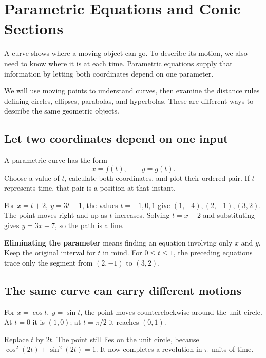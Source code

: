 \section{Parametric Equations and Conic Sections}
A curve shows where a moving object can go. To describe its motion, we also need to know where it is at each time. Parametric equations supply that information by letting both coordinates depend on one parameter.

We will use moving points to understand curves, then examine the distance rules defining circles, ellipses, parabolas, and hyperbolas. These are different ways to describe the same geometric objects.

\hypertarget{m8-let-two-coordinates-depend-on-one-input}{%
\subsection{Let two coordinates depend on one input}\label{m8-let-two-coordinates-depend-on-one-input}}

A parametric curve has the form \[
x=f(t),\qquad y=g(t).
\] Choose a value of \(t\), calculate both coordinates, and plot their ordered pair. If \(t\) represents time, that pair is a position at that instant.

For \(x=t+2,\ y=3t-1\), the values \(t=-1,0,1\) give \((1,-4),(2,-1),(3,2)\). The point moves right and up as \(t\) increases. Solving \(t=x-2\) and substituting gives \(y=3x-7\), so the path is a line.

\textbf{Eliminating the parameter} means finding an equation involving only \(x\) and \(y\). Keep the original interval for \(t\) in mind. For \(0\le t\le1\), the preceding equations trace only the segment from \((2,-1)\) to \((3,2)\).

\hypertarget{m8-the-same-curve-can-carry-different-motions}{%
\subsection{The same curve can carry different motions}\label{m8-the-same-curve-can-carry-different-motions}}

For \(x=\cos t,\ y=\sin t\), the point moves counterclockwise around the unit circle. At \(t=0\) it is \((1,0)\); at \(t=\pi/2\) it reaches \((0,1)\).

Replace \(t\) by \(2t\). The point still lies on the unit circle, because \(\cos^2(2t)+\sin^2(2t)=1\). It now completes a revolution in \(\pi\) units of time.

